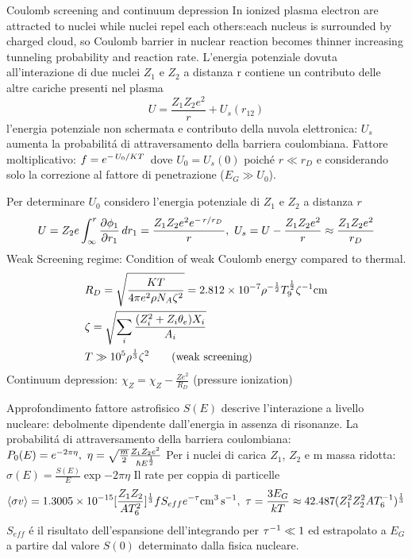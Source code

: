 \begin{frame}{Coulomb screening and continuum depression}
    In ionized plasma electron are attracted to nuclei while nuclei repel each others:each nucleus is surrounded by charged cloud, so Coulomb barrier in nuclear reaction becomes thinner increasing tunneling probability and reaction rate.
    L'energia potenziale dovuta all'interazione di due nuclei $Z_1$ e $Z_2$ a distanza r contiene un contributo delle altre cariche presenti nel plasma
    \begin{equation*}
    U=\frac{Z_1Z_2e^2}{r}+U_s(r_{12})
    \end{equation*}
    l'energia potenziale non schermata e contributo della nuvola elettronica: $U_s$ aumenta la probabilit\'a di attraversamento della barriera coulombiana.
    Fattore moltiplicativo: $f=e^{-\left.{U_0}\middle/{KT}\right.}$ dove $U_0=U_s(0)$ poich\'e $r\ll r_D$ e considerando solo la correzione al fattore di penetrazione ($E_G\gg U_0$).

Per determinare $U_0$ considero l'energia potenziale di $Z_1$ e $Z_2$ a distanza $r$
\begin{equation*}
U=Z_2e\int_{\infty}^r\PDy{r_1}{\phi_1}\,dr_1=\frac{Z_1Z_2e^2\exp{-\midfrac{r}{r_D}}}{r},\ U_s=U-\frac{Z_1Z_2e^2}{r}\approx\frac{Z_1Z_2e^2}{r_D}
\end{equation*}
Weak Screening regime: Condition of weak Coulomb energy compared to thermal.
\begin{align*}
    &R_D=\sqrt{\frac{KT}{4\pi e^2\rho N_A\zeta^2}}=\num{2.812e-7}\rho^{-\frac{1}{2}}T_9^{\frac{1}{2}}\invers{\zeta}\si{\cm}\\
    &\zeta=\sqrt{\sum_i \frac{(Z_i^2+Z_i\theta_e)X_i}{A_i}}\\
    &T\gg \num{e5}\rho^{\frac{1}{3}}\zeta^2\tag{weak screening}
\end{align*}
Continuum depression: $\chi_Z=\chi_Z-\frac{Ze^2}{R_D}$ (pressure ionization)
\end{frame}

\begin{frame}{Approfondimento fattore astrofisico}
$S(E)$ descrive l'interazione a livello nucleare: debolmente dipendente dall'energia in assenza di risonanze.
La probabilit\'a di attraversamento della barriera coulombiana: $P_0(E)=\exp{-2\pi\eta},\ \eta=\sqrt{\frac{m}{2}}\frac{Z_1Z_2e^2}{\hbar E\expy{\frac{1}{2}}}$
Per i nuclei di carica $Z_1$, $Z_2$ e m massa ridotta: $\sigma(E)=\frac{S(E)}{E}\exp{-2\pi\eta}$
Il rate per coppia di particelle
\begin{equation*}
\exv{\sigma v}=\num{1.3005e-15}[\frac{Z_1Z_2}{AT_6^2}]\expy{\frac{1}{3}}fS_{eff}\exp{-\tau}\si{\cubic\cm\per\second},\ \tau=\frac{3E_G}{kT}\approx\num{42.487}(Z_1^2Z_2^2AT_6\expy{-1})\expy{\frac{1}{3}}
\end{equation*}
$S_{eff}$ \'e il risultato dell'espansione dell'integrando per ${\tau}^{-1}\ll1$ ed estrapolato a $E_G$ a partire dal valore $S(0)$ determinato dalla fisica nucleare.
\end{frame}

